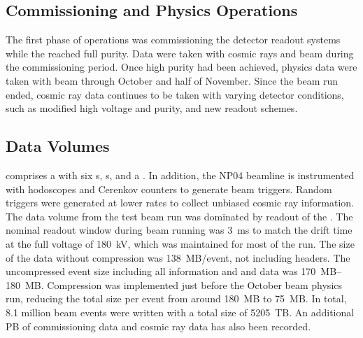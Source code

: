 \subsection{Commissioning and Physics Operations}

The first phase of operations was commissioning the detector readout systems while the  reached full purity.  Data were taken with cosmic rays and beam during the commissioning period. Once high  purity had been achieved, physics data were  taken with beam through October and half of November. %
Since the beam run ended, cosmic ray data continues to be taken with varying detector conditions, such as modified high voltage and purity, and new readout schemes. 



\subsection{Data Volumes}
 comprises a  with  six s, s, and a . In addition, the NP04 beamline is instrumented with hodoscopes and Cerenkov counters to generate beam triggers. Random triggers  were generated at lower rates to collect unbiased cosmic ray information. The data volume from the test beam run was dominated by readout of the . %
The nominal readout window during beam running was  \SI{3}{ms} to match the drift time at the full voltage of \SI{180}{kV}, which was maintained for most of the run.  The size of the  data without compression was  \SI{138}{MB/event}, not including headers.  The uncompressed event size including all  information and  and  data was \SIrange{170}{180}{MB}. Compression was implemented just before the October beam physics run, reducing the total size per event from around \SI{180}{MB} to \SI{75}{MB}.  In total, 8.1 million beam events were written with a total size of \SI{5205}{TB}.  An additional PB of commissioning data and cosmic ray data has also been recorded. 


